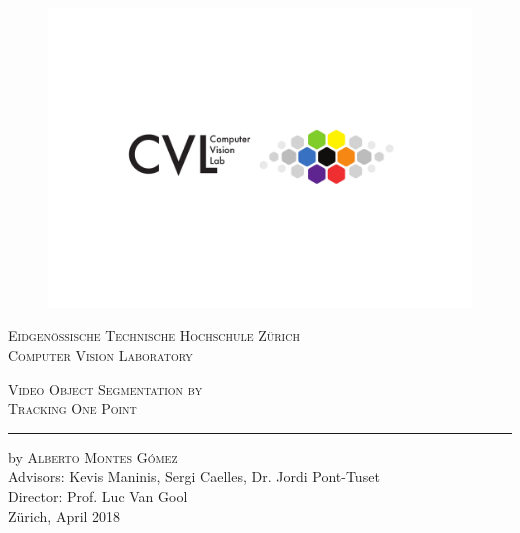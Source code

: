 
\begin{titlingpage}
\begin{center}

\begin{figure}
  \includegraphics[trim={0 6cm 0 4cm},clip,width=1\linewidth]{figures/cvl_logo.pdf}
\end{figure}

{\selectfont
\large{\textsc{Eidgen\"ossische Technische Hochschule Z\"urich\\[1mm]
Computer Vision Laboratory\\[25mm]}}

\huge{\textsc{Video Object Segmentation by \\ Tracking One Point}}
\vskip 0.5cm
\hrule
\vskip 2.6cm

\Large
by \textsc{Alberto Montes G\'omez}\\[2cm]

\large
Advisors:
Kevis Maninis,
Sergi Caelles,
Dr. Jordi Pont-Tuset
\\
Director:
Prof. Luc Van Gool
\\
Z\"urich,
April 2018}
\end{center}
\end{titlingpage}
